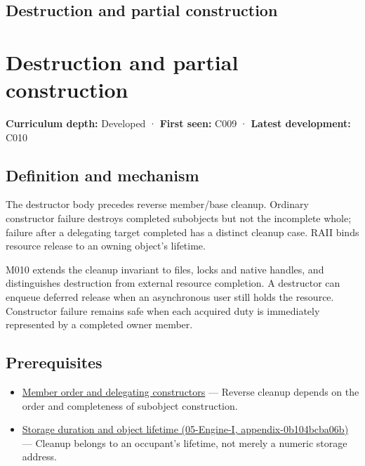 \hypertarget{appendix-9bfe377cef7a}{}
\section*{Destruction and partial construction}
\chapter{Destruction and partial construction}\label{appendix-9bfe377cef7a-destruction-and-partial-construction}

\textbf{Curriculum depth:} Developed · \textbf{First seen:} C009 · \textbf{Latest development:} C010

\section{Definition and mechanism}\label{appendix-9bfe377cef7a-definition-and-mechanism}

The destructor body precedes reverse member/base cleanup. Ordinary constructor failure destroys completed subobjects but not the incomplete whole; failure after a delegating target completed has a distinct cleanup case. RAII binds resource release to an owning object's lifetime.

M010 extends the cleanup invariant to files, locks and native handles, and distinguishes destruction from external resource completion. A destructor can enqueue deferred release when an asynchronous user still holds the resource. Constructor failure remains safe when each acquired duty is immediately represented by a completed owner member.

\section{Prerequisites}\label{appendix-9bfe377cef7a-prerequisites}

\begin{itemize}
\tightlist
\item
  \hyperref[appendix-3cb49709605a]{Member order and delegating constructors} --- Reverse cleanup depends on the order and completeness of subobject construction.
\item
  \href{../05-Engine-I/main.pdf\#nameddest=appendix-0b104bcba06b}{Storage duration and object lifetime (05-Engine-I, appendix-0b104bcba06b)} --- Cleanup belongs to an occupant's lifetime, not merely a numeric storage address.
\end{itemize}

